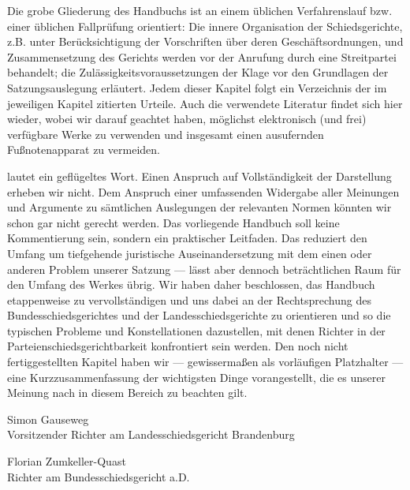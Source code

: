 Die grobe Gliederung des Handbuchs ist an einem üblichen Verfahrenslauf bzw. einer üblichen Fallprüfung orientiert:
Die innere Organisation der Schiedsgerichte, z.B. unter Berücksichtigung der Vorschriften über deren Geschäftsordnungen, und Zusammensetzung des Gerichts werden vor der Anrufung durch eine Streitpartei behandelt; die Zulässigkeitsvoraussetzungen der Klage vor den Grundlagen der Satzungsauslegung erläutert.
Jedem dieser Kapitel folgt ein Verzeichnis der im jeweiligen Kapitel zitierten Urteile.
Auch die verwendete Literatur findet sich hier wieder, wobei wir darauf geachtet haben, möglichst elektronisch (und frei) verfügbare Werke zu verwenden und insgesamt einen ausufernden Fußnotenapparat zu vermeiden.

 lautet ein geflügeltes Wort.
Einen Anspruch auf Vollständigkeit der Darstellung erheben wir nicht.
Dem Anspruch einer umfassenden Widergabe aller Meinungen und Argumente zu sämtlichen Auslegungen der relevanten Normen könnten wir schon gar nicht gerecht werden.
Das vorliegende Handbuch soll keine Kommentierung sein, sondern ein praktischer Leitfaden.
Das reduziert den Umfang um tiefgehende juristische Auseinandersetzung mit dem einen oder anderen Problem unserer Satzung --- lässt aber dennoch beträchtlichen Raum für den Umfang des Werkes übrig.
Wir haben daher beschlossen, das Handbuch etappenweise zu vervollständigen und uns dabei an der Rechtsprechung des Bundesschiedsgerichtes und der Landesschiedsgerichte zu orientieren und so die typischen Probleme und Konstellationen dazustellen, mit denen Richter in der Parteienschiedsgerichtbarkeit konfrontiert sein werden.
Den noch nicht fertiggestellten Kapitel haben wir --- gewissermaßen als vorläufigen Platzhalter --- eine Kurzzusammenfassung der wichtigsten Dinge vorangestellt, die es unserer Meinung nach in diesem Bereich zu beachten gilt.


\vspace{20mm}

Simon Gauseweg\\
Vorsitzender Richter am Landesschiedsgericht Brandenburg

\vspace{5mm}

Florian Zumkeller-Quast\\
Richter am Bundesschiedsgericht a.D.


 
